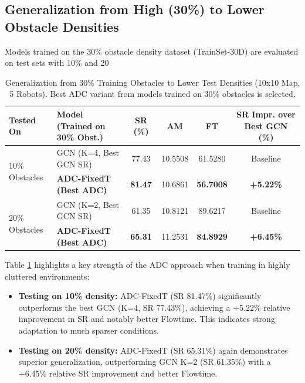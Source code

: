 \subsection{Generalization from High (30\%) to Lower Obstacle Densities}
\label{subsec:gen_high_to_low}
Models trained on the 30\% obstacle density dataset (TrainSet-30D) are evaluated on test sets with 10\% and 20%

\begin{table}[htbp]
    \centering
    \caption{Generalization from 30\% Training Obstacles to Lower Test Densities (10x10 Map, 5 Robots). Best ADC variant from models trained on 30\% obstacles is selected.}
    \label{tab:gen_30D_to_low_revised}
    \scriptsize
    \begin{tabular}{llcccc}
        \toprule
        Tested On & Model (Trained on 30\% Obst.) & SR (\%) & AM & FT & SR Impr. over Best GCN (\%) \\
        \midrule
        \multirow{2}{*}{10\% Obstacles} %
        & GCN (K=4, Best GCN SR) & 77.43 & 10.5508 & 61.5280 & Baseline \\
        & \textbf{ADC-FixedT (Best ADC)} & \textbf{81.47} & 10.6861 & \textbf{56.7008} & \textbf{+5.22\%} \\
        \midrule
        \multirow{2}{*}{20\% Obstacles} %
        & GCN (K=2, Best GCN SR) & 61.35 & 10.8121 & 89.6217 & Baseline \\
        & \textbf{ADC-FixedT (Best ADC)} & \textbf{65.31} & 11.2531 & \textbf{84.8929} & \textbf{+6.45\%} \\
        \bottomrule
    \end{tabular}
\end{table}
Table \ref{tab:gen_30D_to_low_revised} highlights a key strength of the ADC approach when training in highly cluttered environments:
\begin{itemize}
    \item \textbf{Testing on 10\% density:} ADC-FixedT (SR 81.47\%) significantly outperforms the best GCN (K=4, SR 77.43\%), achieving a +5.22\% relative improvement in SR and notably better Flowtime. This indicates strong adaptation to much sparser conditions.
    \item \textbf{Testing on 20\% density:} ADC-FixedT (SR 65.31\%) again demonstrates superior generalization, outperforming GCN K=2 (SR 61.35\%) with a +6.45\% relative SR improvement and better Flowtime.
\end{itemize}
